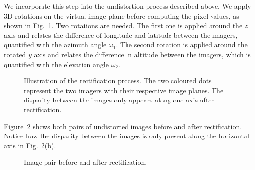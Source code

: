 We incorporate this step into the undistortion process described above. We apply 3D rotations on the virtual image plane before computing the pixel values, as shown in Fig.~\ref{fig:rectification}. Two rotations are needed. The first one is applied around the $z$ axis and relates the difference of longitude and latitude between the imagers, quantified with the azimuth angle $\omega_1$. The second rotation is applied around the rotated $y$ axis and relates the difference in altitude between the imagers, which is quantified with the elevation angle $\omega_2$. 

\begin{figure}[htb]
\centering
{}
\caption[Illustration of the rectification process of the fish-eye effect.]{Illustration of the rectification process. The two coloured dots represent the two imagers with their respective image planes. The disparity between the images only appears along one axis after rectification.}\label{fig:rectification}
\end{figure}

Figure~\ref{fig:rectification-result} shows both pairs of undistorted images before and after rectification. Notice how the disparity between the images is only present along the horizontal axis in Fig.~\ref{fig:rectification-result}(b).

\begin{figure}[htb]
\centering
{}
\hspace{2mm}
\caption{Image pair before and after rectification.}\label{fig:rectification-result}
\end{figure}


